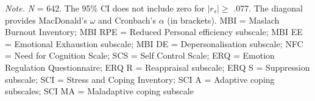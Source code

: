 \documentclass[
  english,
  man]{apa6}
\newenvironment{lltable}{\begin{landscape}\centering\begin{ThreePartTable}}{\end{ThreePartTable}\end{landscape}}
\begin{document}
\begin{lltable}

\begin{TableNotes}[para]
\normalsize{\textit{Note.} \textit{N} = 642. The 95\% CI does not include zero for $|r_{s}|\geq$ .077. The diagonal provides MacDonald’s $\omega$ and Cronbach’s $\alpha$ (in brackets). MBI = Maslach Burnout Inventory; MBI RPE = Reduced Personal efficiency subscale; MBI EE = Emotional Exhaustion subscale; MBI DE = Depersonalisation subscale; NFC = Need for Cognition Scale; SCS = Self Control Scale; ERQ = Emotion Regulation Questionnaire; ERQ R = Reappraisal subscale; ERQ S = Suppression subscale; SCI = Stress and Coping Inventory; SCI A = Adaptive coping subscales; SCI MA = Maladaptive coping subscale}
\end{TableNotes}

\scriptsize{

}
\end{lltable}
\end{document}
